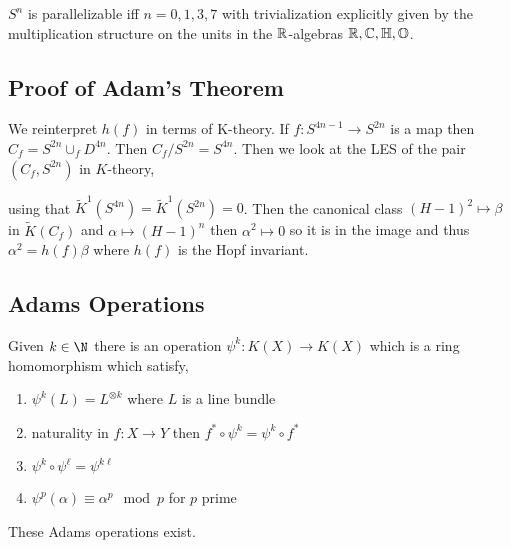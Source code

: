 \documentclass[12pt]{extarticle}
\begin{document}
\begin{cor}
$S^n$ is parallelizable iff $n = 0,1,3,7$ with trivialization explicitly given by the multiplication structure on the units in the $\mathbb{R}$-algebras $\mathbb{R}, \mathbb{C}, \mathbb{H}, \mathbb{O}$.
\end{cor}

\subsection{Proof of Adam's Theorem}

We reinterpret $h(f)$ in terms of K-theory. If $f : S^{4n - 1} \to S^{2n}$ is a map then $C_f = S^{2n} \cup_f D^{4n}$. Then $C_f / S^{2n} = S^{4n}$. Then we look at the LES of the pair $(C_f, S^{2n})$ in $K$-theory,
\begin{center}
\end{center}
using that $\tilde{K}^1(S^{4n}) = \tilde{K}^1(S^{2n}) = 0$. Then the canonical class $(H - 1)^2 \mapsto \beta$ in $\tilde{K}(C_f)$ and $\alpha \mapsto (H - 1)^n$ then $\alpha^2 \mapsto 0$ so it is in the image and thus $\alpha^2 = h(f) \beta$ where $h(f)$ is the Hopf invariant.

\subsection{Adams Operations}

Given $k \in \N$ there is an operation $\psi^k : K(X) \to K(X)$ which is a ring homomorphism which satisfy,
\begin{enumerate}
\item $\psi^k(L) = L^{\otimes k}$ where $L$ is a line bundle
\item naturality in $f : X \to Y$ then $f^* \circ \psi^k = \psi^k \circ f^*$ 
\item $\psi^k \circ \psi^\ell = \psi^{k \ell}$
\item $\psi^p(\alpha) \equiv \alpha^p \mod{p}$ for $p$ prime
\end{enumerate}

\begin{theorem}
These Adams operations exist.
\end{theorem}
\end{document}
